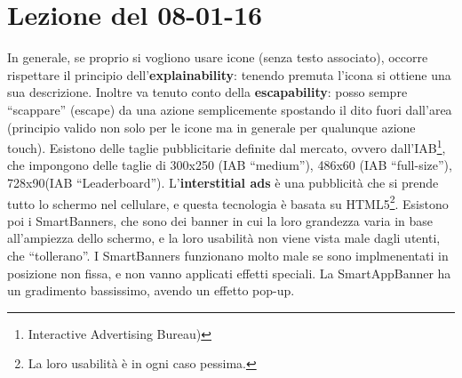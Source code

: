 \section{Lezione del 08-01-16}

In generale, se proprio si vogliono usare icone (senza testo associato), occorre rispettare il principio dell'\textbf{explainability}: tenendo premuta l'icona si ottiene una sua descrizione. Inoltre va tenuto conto della \textbf{escapability}: posso sempre ``scappare'' (escape) da una azione semplicemente spostando il dito fuori dall'area (principio valido non solo per le icone ma in generale per qualunque azione touch).
Esistono delle taglie pubblicitarie definite dal mercato, ovvero dall'IAB\footnote{Interactive Advertising Bureau)}, che impongono delle taglie di 300x250 (IAB ``medium''), 486x60 (IAB ``full-size''), 728x90(IAB ``Leaderboard''). L'\textbf{interstitial ads} \`e una pubblicit\`a che si prende tutto lo schermo nel cellulare, e questa tecnologia \`e basata su HTML5\footnote{La loro usabilit\`a \`e in ogni caso pessima.}. Esistono poi i SmartBanners, che sono dei banner in cui la loro grandezza varia in base all'ampiezza dello schermo, e la loro usabilit\`a non viene vista male dagli utenti, che ``tollerano''. I SmartBanners funzionano molto male se sono implmenentati in posizione non fissa, e non vanno applicati effetti speciali. La SmartAppBanner ha un gradimento bassissimo, avendo un effetto pop-up.

